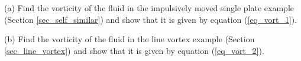 



\begin{problem}
\label{prob_vorticity}

(a) Find the vorticity of the fluid in the impulsively moved single plate example (Section \ref{sec_self_similar}) and show that it is given by equation (\ref{eq_vort_1}).

(b) Find the vorticity of the fluid in the line vortex example (Section \ref{sec_line_vortex}) and show that it is given by equation (\ref{eq_vort_2}).
\end{problem}


